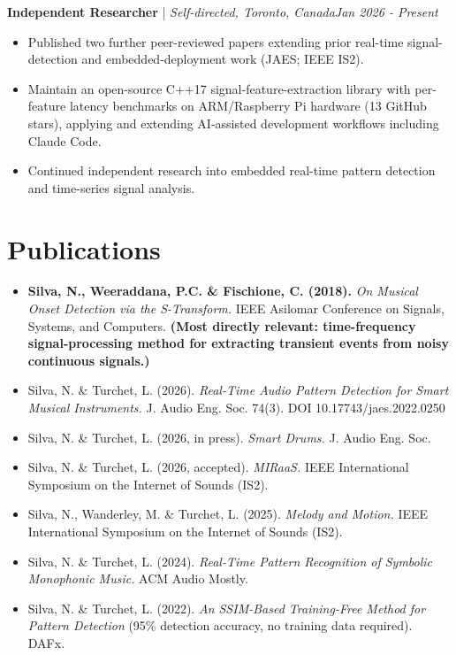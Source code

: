 \documentclass[11pt]{article}
\newenvironment{cvrole}[5]{%
  \par\noindent\textbf{\large #1} | \textit{\small #2, #3}\hfill \textit{\small #4 - #5}\par
  \begin{itemize}[leftmargin=2em, itemsep=-0.3em, topsep=-0.5em]%
}{%
  \end{itemize}\par\noindent\mbox{}\par\vspace{0.1em}%
}
\begin{document}
\begin{cvrole}{Independent Researcher}{Self-directed}{Toronto, Canada}{Jan 2026}{Present}
    \item Published two further peer-reviewed papers extending prior real-time signal-detection and embedded-deployment work (JAES; IEEE IS2).
    \item Maintain an open-source C++17 signal-feature-extraction library with per-feature latency benchmarks on ARM/Raspberry Pi hardware (13 GitHub stars), applying and extending AI-assisted development workflows including Claude Code.
    \item Continued independent research into embedded real-time pattern detection and time-series signal analysis.
\end{cvrole}

\section*{Publications}
\begin{itemize}[leftmargin=2em, itemsep=-0.3em, topsep=0.2em]
    \item \textbf{Silva, N., Weeraddana, P.C. \& Fischione, C. (2018).} \textit{On Musical Onset Detection via the S-Transform.} IEEE Asilomar Conference on Signals, Systems, and Computers. \textbf{(Most directly relevant: time-frequency signal-processing method for extracting transient events from noisy continuous signals.)}
    \item Silva, N. \& Turchet, L. (2026). \textit{Real-Time Audio Pattern Detection for Smart Musical Instruments.} J. Audio Eng. Soc. 74(3). DOI 10.17743/jaes.2022.0250
    \item Silva, N. \& Turchet, L. (2026, in press). \textit{Smart Drums.} J. Audio Eng. Soc.
    \item Silva, N. \& Turchet, L. (2026, accepted). \textit{MIRaaS.} IEEE International Symposium on the Internet of Sounds (IS2).
    \item Silva, N., Wanderley, M. \& Turchet, L. (2025). \textit{Melody and Motion.} IEEE International Symposium on the Internet of Sounds (IS2).
    \item Silva, N. \& Turchet, L. (2024). \textit{Real-Time Pattern Recognition of Symbolic Monophonic Music.} ACM Audio Mostly.
    \item Silva, N. \& Turchet, L. (2022). \textit{An SSIM-Based Training-Free Method for Pattern Detection} (95\% detection accuracy, no training data required). DAFx.
\end{itemize}
\end{document}
